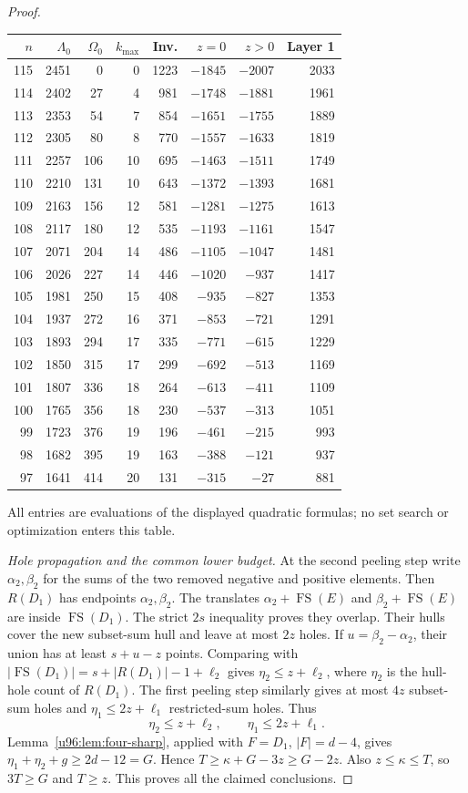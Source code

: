 \documentclass[11pt,a4paper]{article}
\theoremstyle{remark}
\newcommand{\FS}{\operatorname{FS}}
\begin{document}
\begin{proof}
\begin{center}\small
\begin{tabular}{rrrrrrrr}
\toprule
$n$&$\Lambda_0$&$\Omega_0$&$k_{\max}$&Inv.&$z=0$&$z>0$&Layer 1\\\midrule
115&2451&0&0&1223&$-1845$&$-2007$&2033\\
114&2402&27&4&981&$-1748$&$-1881$&1961\\
113&2353&54&7&854&$-1651$&$-1755$&1889\\
112&2305&80&8&770&$-1557$&$-1633$&1819\\
111&2257&106&10&695&$-1463$&$-1511$&1749\\
110&2210&131&10&643&$-1372$&$-1393$&1681\\
109&2163&156&12&581&$-1281$&$-1275$&1613\\
108&2117&180&12&535&$-1193$&$-1161$&1547\\
107&2071&204&14&486&$-1105$&$-1047$&1481\\
106&2026&227&14&446&$-1020$&$-937$&1417\\
105&1981&250&15&408&$-935$&$-827$&1353\\
104&1937&272&16&371&$-853$&$-721$&1291\\
103&1893&294&17&335&$-771$&$-615$&1229\\
102&1850&315&17&299&$-692$&$-513$&1169\\
101&1807&336&18&264&$-613$&$-411$&1109\\
100&1765&356&18&230&$-537$&$-313$&1051\\
99&1723&376&19&196&$-461$&$-215$&993\\
98&1682&395&19&163&$-388$&$-121$&937\\
97&1641&414&20&131&$-315$&$-27$&881\\\bottomrule
\end{tabular}
\end{center}
All entries are evaluations of the displayed quadratic formulas; no
set search or optimization enters this table.

\emph{Hole propagation and the common lower budget.}
At the second peeling step write $\alpha_2,\beta_2$ for the sums of the
two removed negative and positive elements. Then $R(D_1)$ has endpoints
$\alpha_2,\beta_2$. The translates
$\alpha_2+\FS(E)$ and $\beta_2+\FS(E)$ are inside $\FS(D_1)$.
The strict $2s$ inequality proves they overlap. Their hulls cover the
new subset-sum hull and leave at most $2z$ holes.
If $u=\beta_2-\alpha_2$, their union has at least $s+u-z$ points.
Comparing with
$|\FS(D_1)|=s+|R(D_1)|-1+\ell_2$
gives $\eta_2\leq z+\ell_2$, where $\eta_2$ is the hull-hole count
of $R(D_1)$. The first peeling step similarly gives at most $4z$
subset-sum holes and $\eta_1\leq2z+\ell_1$ restricted-sum holes.
Thus
\begin{equation}
 \eta_2\leq z+\ell_2,\qquad\eta_1\leq2z+\ell_1.
 \label{u96:eq:prop-new}
\end{equation}
Lemma~\ref{u96:lem:four-sharp}, applied with $F=D_1$, $|F|=d-4$, gives
$\eta_1+\eta_2+g\geq2d-12=G$. Hence
$T\geq\kappa+G-3z\geq G-2z$.
Also $z\leq\kappa\leq T$, so $3T\geq G$ and $T\geq z$.
This proves all the claimed conclusions.
\end{proof}
\end{document}
